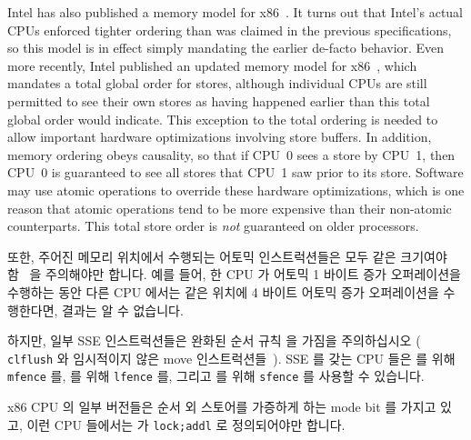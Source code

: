 Intel has also published a memory model for
x86~\cite{Intelx86MemoryOrdering2007}.
It turns out that Intel's actual CPUs enforced tighter ordering than
was claimed in the previous specifications, so this model is in effect
simply mandating the earlier de-facto behavior.
Even more recently, Intel published an updated memory model for
x86~\cite[Section 8.2]{Intel64IA32v3A2011}, which mandates a total global order
for stores, although individual CPUs are still permitted to see their
own stores as having happened earlier than this total global order
would indicate.
This exception to the total ordering is needed to allow important
hardware optimizations involving store buffers.
In addition, memory ordering obeys causality, so that if CPU~0 sees a
store by CPU~1, then CPU~0 is guaranteed to see all stores that CPU~1
saw prior to its store.
Software may use atomic operations to override these hardware optimizations,
which is one reason that atomic operations tend to be more expensive
than their non-atomic counterparts.
This total store order is \emph{not} guaranteed on older processors.
\fi

또한, 주어진 메모리 위치에서 수행되는 어토믹 인스트럭션들은 모두 같은 크기여야
함~\cite[Section 8.1.2.2]{Intel64IA32v3A2011} 을 주의해야만 합니다.
예를 들어, 한 CPU 가 어토믹 1 바이트 증가 오퍼레이션을 수행하는 동안 다른 CPU
에서는 같은 위치에 4 바이트 어토믹 증가 오퍼레이션을 수행한다면, 결과는 알 수
없습니다.

하지만, 일부 SSE 인스트럭션들은 완화된 순서 규칙 을 가짐을 주의하십시오 ({\tt
clflush} 와 임시적이지 않은 move 인스트럭션들~\cite{IntelXeonV2b-96a}).
SSE 를 갖는 CPU 들은  를 위해 {\tt mfence} 를,
 를 위해 {\tt lfence} 를, 그리고  를 위해
{\tt sfence} 를 사용할 수 있습니다.

x86 CPU 의 일부 버전들은 순서 외 스토어를 가증하게 하는 mode bit 를 가지고
있고, 이런 CPU 들에서는  가 {\tt lock;addl} 로 정의되어야만
합니다.

